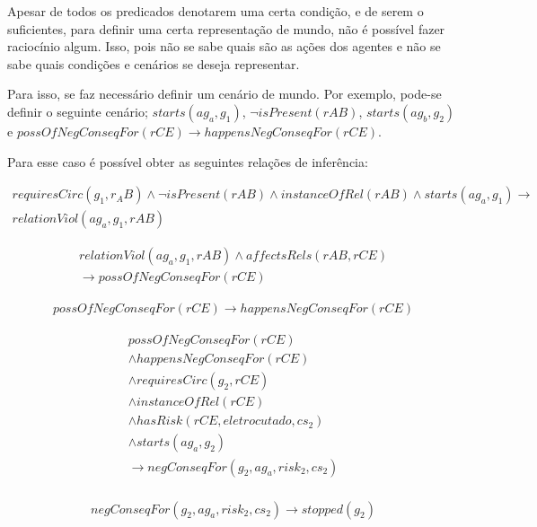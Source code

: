Apesar de todos os predicados denotarem uma certa condição, e de serem o suficientes, para definir uma certa representação de mundo, não é possível fazer raciocínio algum. Isso, pois não se sabe quais são as ações dos agentes e não se sabe quais condições e cenários se deseja representar.  

Para isso, se faz necessário definir um cenário de mundo. Por exemplo, pode-se definir o seguinte cenário; $starts(ag_a,g_1)$, $\neg isPresent(rAB)$, $starts(ag_b,g_2)$ e $ possOfNegConseqFor(rCE) \to happensNegConseqFor(rCE)$. 

Para esse caso é possível obter as seguintes relações de inferência: 

\begin{eqnarray}
    requiresCirc(g_1,r_AB)\wedge 
    \neg isPresent(rAB) \wedge 
    instanceOfRel(rAB) \wedge 
    starts(ag_a,g_1) \to \nonumber \\
    relationViol(ag_a,g_1,rAB) 
\end{eqnarray}

\begin{eqnarray}
    relationViol(ag_a,g_1,rAB)  \wedge 
    affectsRels(rAB,rCE) \nonumber \\
    \to possOfNegConseqFor(rCE)  
\end{eqnarray}

\begin{eqnarray}
    possOfNegConseqFor(rCE) \to happensNegConseqFor(rCE) 
\end{eqnarray}

\begin{eqnarray}\label{paybutiamnotguilty}
   possOfNegConseqFor(rCE) \nonumber \\
   \wedge happensNegConseqFor(rCE) \nonumber \\ 
   \wedge requiresCirc(g_2,rCE) \nonumber \\  
   \wedge instanceOfRel(rCE) \nonumber \\ 
   \wedge hasRisk(rCE,eletrocutado,cs_2) \nonumber \\  
   \wedge starts(ag_a,g_2) \nonumber \\ 
   \to negConseqFor(g_2,ag_a,risk_2,cs_2) \\ \nonumber
\end{eqnarray}


\begin{eqnarray}\label{badcons}
    negConseqFor(g_2,ag_a,risk_2,cs_2) \to stopped(g_2) 
\end{eqnarray}


